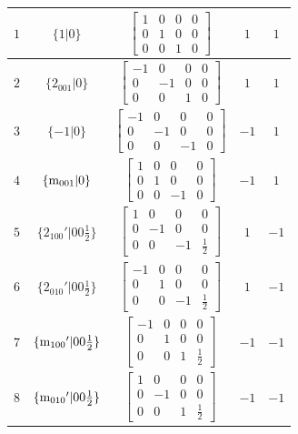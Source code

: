 \documentclass[fleqn,8pt]{jsarticle}
\begin{document}
\begin{longtable}{ccccc}
$ 1 $ & $ \{1|0\} $ & $ \begin{bmatrix} 1 & 0 & 0 & 0 \\ 0 & 1 & 0 & 0 \\ 0 & 0 & 1 & 0 \end{bmatrix} $ & $ 1 $ & $ 1 $ \\ \hline
$ 2 $ & $ \{2{}_{001}|0\} $ & $ \begin{bmatrix} -1 & 0 & 0 & 0 \\ 0 & -1 & 0 & 0 \\ 0 & 0 & 1 & 0 \end{bmatrix} $ & $ 1 $ & $ 1 $ \\ \hline
$ 3 $ & $ \{-1|0\} $ & $ \begin{bmatrix} -1 & 0 & 0 & 0 \\ 0 & -1 & 0 & 0 \\ 0 & 0 & -1 & 0 \end{bmatrix} $ & $ -1 $ & $ 1 $ \\ \hline
$ 4 $ & $ \{{\rm m}_{001}|0\} $ & $ \begin{bmatrix} 1 & 0 & 0 & 0 \\ 0 & 1 & 0 & 0 \\ 0 & 0 & -1 & 0 \end{bmatrix} $ & $ -1 $ & $ 1 $ \\ \hline
$ 5 $ & $ \{2{}_{100}{}'|0 0 \frac{1}{2}\} $ & $ \begin{bmatrix} 1 & 0 & 0 & 0 \\ 0 & -1 & 0 & 0 \\ 0 & 0 & -1 & \frac{1}{2} \end{bmatrix} $ & $ 1 $ & $ -1 $ \\ \hline
$ 6 $ & $ \{2{}_{010}{}'|0 0 \frac{1}{2}\} $ & $ \begin{bmatrix} -1 & 0 & 0 & 0 \\ 0 & 1 & 0 & 0 \\ 0 & 0 & -1 & \frac{1}{2} \end{bmatrix} $ & $ 1 $ & $ -1 $ \\ \hline
$ 7 $ & $ \{{\rm m}_{100}{}'|0 0 \frac{1}{2}\} $ & $ \begin{bmatrix} -1 & 0 & 0 & 0 \\ 0 & 1 & 0 & 0 \\ 0 & 0 & 1 & \frac{1}{2} \end{bmatrix} $ & $ -1 $ & $ -1 $ \\ \hline
$ 8 $ & $ \{{\rm m}_{010}{}'|0 0 \frac{1}{2}\} $ & $ \begin{bmatrix} 1 & 0 & 0 & 0 \\ 0 & -1 & 0 & 0 \\ 0 & 0 & 1 & \frac{1}{2} \end{bmatrix} $ & $ -1 $ & $ -1 $ \\
\end{longtable}
\end{document}
